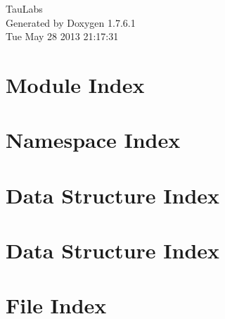 \documentclass[a4paper]{book}
\begin{document}
\hypersetup{pageanchor=false,citecolor=blue}
\begin{titlepage}
\vspace*{7cm}
\begin{center}
{\Large \-Tau\-Labs }\\
\vspace*{1cm}
{\large \-Generated by Doxygen 1.7.6.1}\\
\vspace*{0.5cm}
{\small Tue May 28 2013 21:17:31}\\
\end{center}
\end{titlepage}
\clearemptydoublepage
{}
\tableofcontents
\clearemptydoublepage
{}
\hypersetup{pageanchor=true,citecolor=blue}
\chapter{\-Module \-Index}

\chapter{\-Namespace \-Index}

\chapter{\-Data \-Structure \-Index}

\chapter{\-Data \-Structure \-Index}

\chapter{\-File \-Index}

\end{document}
